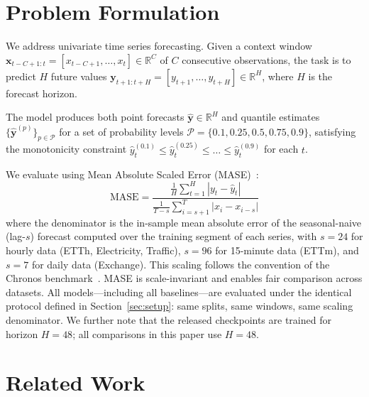 \documentclass[11pt]{article}
\begin{document}
\section{Problem Formulation}
\label{sec:problem}

We address univariate time series forecasting. Given a context window $\mathbf{x}_{t-C+1:t} = [x_{t-C+1}, \ldots, x_t] \in \mathbb{R}^C$ of $C$ consecutive observations, the task is to predict $H$ future values $\mathbf{y}_{t+1:t+H} = [y_{t+1}, \ldots, y_{t+H}] \in \mathbb{R}^H$, where $H$ is the forecast horizon.

The model produces both point forecasts $\hat{\mathbf{y}} \in \mathbb{R}^H$ and quantile estimates $\{\hat{\mathbf{y}}^{(p)}\}_{p \in \mathcal{P}}$ for a set of probability levels $\mathcal{P} = \{0.1, 0.25, 0.5, 0.75, 0.9\}$, satisfying the monotonicity constraint $\hat{y}^{(0.1)}_t \leq \hat{y}^{(0.25)}_t \leq \ldots \leq \hat{y}^{(0.9)}_t$ for each $t$.

We evaluate using Mean Absolute Scaled Error (MASE)~\cite{mase}:
\begin{equation}
\text{MASE} = \frac{\frac{1}{H} \sum_{t=1}^{H} |y_t - \hat{y}_t|}{\frac{1}{T-s} \sum_{i=s+1}^{T} |x_i - x_{i-s}|}
\label{eq:mase}
\end{equation}
where the denominator is the in-sample mean absolute error of the seasonal-naive (lag-$s$) forecast computed over the training segment of each series, with $s=24$ for hourly data (ETTh, Electricity, Traffic), $s=96$ for 15-minute data (ETTm), and $s=7$ for daily data (Exchange). This scaling follows the convention of the Chronos benchmark~\cite{chronos}. MASE is scale-invariant and enables fair comparison across datasets. All models---including all baselines---are evaluated under the identical protocol defined in Section~\ref{sec:setup}: same splits, same windows, same scaling denominator. We further note that the released checkpoints are trained for horizon $H=48$; all comparisons in this paper use $H=48$.

\section{Related Work}
\label{sec:related}
\end{document}
